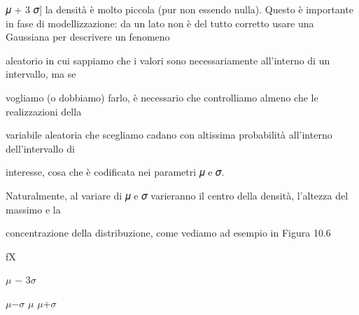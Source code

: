 \documentclass[a4paper,portrait,12pt]{article}
\begin{document}
\begin{flushleft}
𝜇 + 3 𝜎] la densit\`{a} \`{e} molto piccola (pur non essendo nulla). Questo \`{e} importante in fase di modellizzazione: da un lato non \`{e} del tutto corretto usare una Gaussiana per descrivere un fenomeno
\end{flushleft}


\begin{flushleft}
aleatorio in cui sappiamo che i valori sono necessariamente all'interno di un intervallo, ma se
\end{flushleft}


\begin{flushleft}
vogliamo (o dobbiamo) farlo, \`{e} necessario che controlliamo almeno che le realizzazioni della
\end{flushleft}


\begin{flushleft}
variabile aleatoria che scegliamo cadano con altissima probabilit\`{a} all'interno dell'intervallo di
\end{flushleft}


\begin{flushleft}
interesse, cosa che \`{e} codificata nei parametri 𝜇 e 𝜎.
\end{flushleft}


\begin{flushleft}
Naturalmente, al variare di 𝜇 e 𝜎 varieranno il centro della densit\`{a}, l'altezza del massimo e la
\end{flushleft}


\begin{flushleft}
concentrazione della distribuzione, come vediamo ad esempio in Figura 10.6
\end{flushleft}





\begin{flushleft}
fX
\end{flushleft}





\begin{flushleft}
$\mu$ $-$ 3$\sigma$
\end{flushleft}





\begin{flushleft}
$\mu$$-$$\sigma$ $\mu$ $\mu$+$\sigma$
\end{flushleft}
\end{document}
